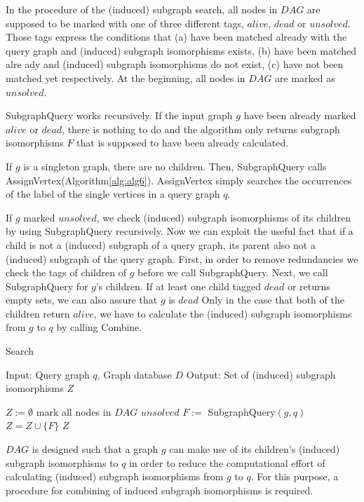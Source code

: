 In the procedure of the (induced) subgraph search, all nodes in $DAG$ are supposed to be marked with one of three different tags, $alive$, $dead$ or $unsolved$.
Those tags express the conditions that (a) have been matched already with the query graph and (induced) subgraph isomorphisms exists, (b) have been matched alre
ady and (induced) subgraph isomorphisms do not exist, (c) have not been matched yet respectively.
At the beginning, all nodes in $DAG$ are marked as $unsolved$.

SubgraphQuery works recursively.
If the input graph $g$ have been already marked $alive$ or $dead$, there is nothing to do and the algorithm only returns subgraph isomorphisms $F$ that is supposed to have been already calculated.

If $g$ is a singleton graph, there are no children.
Then, SubgraphQuery calls AssignVertex(Algorithm\ref{alg:alg6}).
AssignVertex simply searches the occurrences of the label of the single vertices in a query graph $q$.

If $g$ marked $unsolved$, we check (induced) subgraph isomorphisms of its children by using SubgraphQuery recursively.
Now we can exploit the useful fact that if a child is not a (induced) subgraph of a query graph, its parent also not a (induced) subgraph of the query graph.
First, in order to remove redundancies we check the tags of children of $g$ before we call SubgraphQuery. 
Next, we call SubgraphQuery for $g$'s children.
If at least one child tagged $dead$ or returns empty sets, we can also assure that $g$ is $dead$  
Only in the case that both of the children return $alive$, we have to calculate the (induced) subgraph isomorphisms from $g$ to $q$ by calling Combine.

\begin{algorithm}[t]
\caption{Search}
\label{alg:alg4}
\begin{algorithmic}
\STATE Input: Query graph $q$, Graph database $D$
\STATE Output: Set of (induced) subgraph isomorphisms $Z$
\end{algorithmic}
\begin{algorithmic}[1]
\STATE $Z := \emptyset$
\STATE mark all nodes in $DAG$ $unsolved$
	\STATE $F :=$ SubgraphQuery$(g,q)$
		\STATE $Z = Z \cup \{F\}$
	\ENDIF
\ENDFOR
\RETURN $Z$
\end{algorithmic}
\end{algorithm}



$DAG$ is designed such that a graph $g$ can make use of its children's (induced) subgraph isomorphisms to $q$ in order to reduce the computational effort of 
calculating (induced) subgraph isomorphisms from $g$ to $q$. For this purpose, a procedure for combining of induced subgraph isomorphisms is required.

